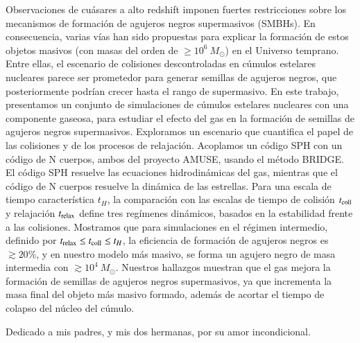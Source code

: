 \documentclass[
	english, %
	letterpaper, oneside
]{book}
\begin{document}
\begin{resumen}
	Observaciones de cuásares a alto redshift imponen fuertes restricciones sobre los mecanismos de formación de agujeros negros supermasivos (SMBHs). En consecuencia, varias vías han sido propuestas para explicar la formación de estos objetos masivos (con masas del orden de $\geq 10^6~M_{\odot}$) en el Universo temprano. Entre ellas, el escenario de colisiones descontroladas en cúmulos estelares nucleares parece ser prometedor para generar semillas de agujeros negros, que posteriormente podrían crecer hasta el rango de supermasivo. En este trabajo, presentamos un conjunto de simulaciones de cúmulos estelares nucleares con una componente gaseosa, para estudiar el efecto del gas en la formación de semillas de agujeros negros supermasivos. Exploramos un escenario que cuantifica el papel de las colisiones y de los procesos de relajación. Acoplamos un código SPH con un código de N cuerpos, ambos del proyecto AMUSE, usando el método BRIDGE. El código SPH resuelve las ecuaciones hidrodinámicas del gas, mientras que el código de N cuerpos resuelve la dinámica de las estrellas. Para una escala de tiempo característica $t_{H}$, la comparación con las escalas de tiempo de colisión $t_{\rm coll}$ y relajación $t_{\rm relax}$ define tres regímenes dinámicos, basados en la estabilidad frente a las colisiones. Mostramos que para simulaciones en el régimen intermedio, definido por $t_{\rm relax} \leq t_{\rm coll} \leq t_{H}$, la eficiencia de formación de agujeros negros es $\gtrsim 20\%$, y en nuestro modelo más masivo, se forma un agujero negro de masa intermedia con $\gtrsim 10^4~M_{\odot}$. Nuestros hallazgos muestran que el gas mejora la formación de semillas de agujeros negros supermasivos, ya que incrementa la masa final del objeto más masivo formado, además de acortar el tiempo de colapso del núcleo del cúmulo.
\end{resumen}

\begin{dedicatory}
	Dedicado a mis padres, y mis dos hermanas, por su amor incondicional.
\end{dedicatory}
\end{document}
